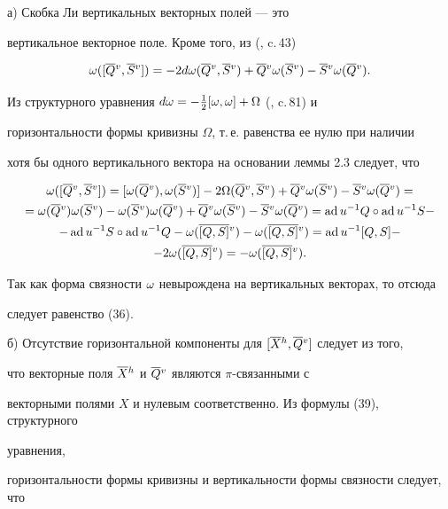 \begin{pf} а) Скобка Ли вертикальных векторных полей --- это


вертикальное векторное поле. Кроме того, из (\cite{Kob1}, c.\,43)


\begin{equation}


\w ([\olv Q,\olv S])=-2d\w (\olv Q,\olv S)+\olv Q\w (\olv S)-\olv S\w (\olv Q).


\end{equation}


Из структурного уравнения $d\omega =-\frac12 [\omega ,\omega ]+\Omega$ (\cite{Kob1}, c.\,81) и


горизонтальности формы кривизны $\Omega$, т.\,е. равенства ее нулю при наличии


хотя бы одного вертикального вектора на основании леммы 2.3 следует, что


\begin{gather*}


\w ([\olv Q,\olv S])=[\w (\olv Q),\w (\olv S)]-2\Omega (\olv Q,\olv S)+\olv Q


\w (\olv S)-\olv S\w (\olv Q)=\\


=\w (\olv Q)\w (\olv S)-\w (\olv S)\w (\olv Q)+\olv Q\w (\olv S)-\olv S


\w (\olv Q)=\ad u^{-1}Q\circ \ad u^{-1}S-\\


-\ad u^{-1}S\circ \ad u^{-1}Q-\w (\olv {[Q,S]})-\w (\olv {[Q,S]})=


\ad u^{-1}[Q,S]-\\


-2\w (\olv {[Q,S]})=-\w (\olv {[Q,S]}).


\end{gather*}


Так как форма связности $\omega$ невырождена на вертикальных векторах, то отсюда


следует равенство (36).





б) Отсутствие горизонтальной компоненты для $[\overline {X}{}^h,\overline {Q}{}^v]$ следует из того,


что векторные поля $\overline {X}{}^h$ и $\overline {Q}{}^v$ являются $\pi$-связанными с


векторными полями $X$ и нулевым соответственно. Из формулы (39), структурного


уравнения,


горизонтальности формы кривизны и вертикальности формы связности следует, что



\end{pf}

